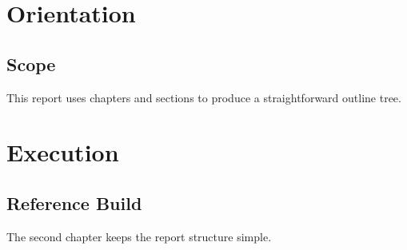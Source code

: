 \documentclass{report}
\begin{document}
\chapter{Orientation}
\section{Scope}
This report uses chapters and sections to produce a straightforward outline tree.

\chapter{Execution}
\section{Reference Build}
The second chapter keeps the report structure simple.
\end{document}
